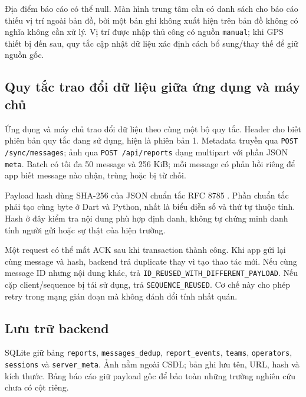 Địa điểm báo cáo có thể null. Màn hình trung tâm cần có danh sách cho báo cáo thiếu vị trí ngoài bản đồ, bởi một bản ghi không xuất hiện trên bản đồ không có nghĩa không cần xử lý. Vị trí được nhập thủ công có nguồn \texttt{manual}; khi GPS thiết bị đến sau, quy tắc cập nhật dữ liệu xác định cách bổ sung/thay thế để giữ nguồn gốc.

\subsection{Quy tắc trao đổi dữ liệu giữa ứng dụng và máy chủ}
Ứng dụng và máy chủ trao đổi dữ liệu theo cùng một bộ quy tắc. Header  cho biết phiên bản quy tắc đang sử dụng, hiện là phiên bản 1. Metadata truyền qua \texttt{POST /sync/messages}; ảnh qua \texttt{POST /api/reports} dạng multipart với phần JSON \texttt{meta}. Batch có tối đa 50 message và 256 KiB; mỗi message có phản hồi riêng để app biết message nào nhận, trùng hoặc bị từ chối.

Payload hash dùng SHA-256 của JSON chuẩn tắc RFC 8785 \citep{rfc8785}. Phần chuẩn tắc phải tạo cùng byte ở Dart và Python, nhất là biểu diễn số và thứ tự thuộc tính. Hash ở đây kiểm tra nội dung phù hợp định danh, không tự chứng minh danh tính người gửi hoặc sự thật của hiện trường.

Một request có thể mất ACK sau khi transaction thành công. Khi app gửi lại cùng message và hash, backend trả duplicate thay vì tạo thao tác mới. Nếu cùng message ID nhưng nội dung khác, trả \texttt{ID\_REUSED\_WITH\_DIFFERENT\_PAYLOAD}. Nếu cặp client/sequence bị tái sử dụng, trả \texttt{SEQUENCE\_REUSED}. Cơ chế này cho phép retry trong mạng gián đoạn mà không đánh đổi tính nhất quán.

\subsection{Lưu trữ backend}
SQLite giữ bảng \texttt{reports}, \texttt{messages\_dedup}, \texttt{report\_events}, \texttt{teams}, \texttt{operators}, \texttt{sessions} và \texttt{server\_meta}. Ảnh nằm ngoài CSDL; bản ghi lưu tên, URL, hash và kích thước. Bảng báo cáo giữ payload gốc để bảo toàn những trường nghiên cứu chưa có cột riêng.


